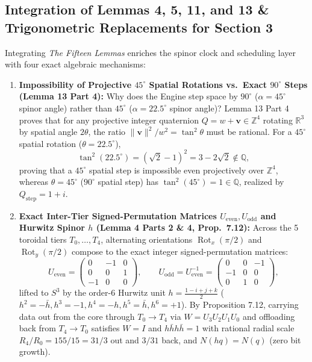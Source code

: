 \documentclass[11pt, a4paper]{article}
\begin{document}
\subsection{Integration of Lemmas 4, 5, 11, and 13 \& Trigonometric Replacements for Section 3}
Integrating \textit{The Fifteen Lemmas} enriches the spinor clock and scheduling layer with four exact algebraic mechanisms:
\begin{enumerate}
    \item \textbf{Impossibility of Projective $45^\circ$ Spatial Rotations vs.\ Exact $90^\circ$ Steps (Lemma 13 Part 4):}
    Why does the Engine step space by $90^\circ$ ($\alpha = 45^\circ$ spinor angle) rather than $45^\circ$ ($\alpha = 22.5^\circ$ spinor angle)? Lemma 13 Part 4 proves that for any projective integer quaternion $Q = w + \mathbf{v} \in \mathbb{Z}^4$ rotating $\mathbb{R}^3$ by spatial angle $2\theta$, the ratio $\|\mathbf{v}\|^2 / w^2 = \tan^2\theta$ must be rational. For a $45^\circ$ spatial rotation ($\theta = 22.5^\circ$),
    \begin{equation}
    \tan^2(22.5^\circ) = (\sqrt{2}-1)^2 = 3 - 2\sqrt{2} \notin \mathbb{Q},
    \end{equation}
    proving that a $45^\circ$ spatial step is impossible even projectively over $\mathbb{Z}^4$, whereas $\theta = 45^\circ$ ($90^\circ$ spatial step) has $\tan^2(45^\circ) = 1 \in \mathbb{Q}$, realized by $Q_{\text{step}} = 1+i$.
    \item \textbf{Exact Inter-Tier Signed-Permutation Matrices $U_{\text{even}}, U_{\text{odd}}$ and Hurwitz Spinor $h$ (Lemma 4 Parts 2 \& 4, Prop.~7.12):}
    Across the 5 toroidal tiers $T_0, \dots, T_4$, alternating orientations $\operatorname{Rot}_x(\pi/2)$ and $\operatorname{Rot}_y(\pi/2)$ compose to the exact integer signed-permutation matrices:
    \begin{equation}
    U_{\text{even}} = \begin{pmatrix} 0 & -1 & 0 \\ 0 & 0 & 1 \\ -1 & 0 & 0 \end{pmatrix}, \qquad U_{\text{odd}} = U_{\text{even}}^{-1} = \begin{pmatrix} 0 & 0 & -1 \\ -1 & 0 & 0 \\ 0 & 1 & 0 \end{pmatrix},
    \end{equation}
    lifted to $S^3$ by the order-6 Hurwitz unit $h = \frac{1 - i + j + k}{2}$ ($h^2 = -\bar{h}, h^3 = -1, h^4 = -h, h^5 = \bar{h}, h^6 = +1$). By Proposition 7.12, carrying data out from the core through $T_0 \to T_4$ via $W = U_3 U_2 U_1 U_0$ and offloading back from $T_4 \to T_0$ satisfies $W = I$ and $h\bar{h}h\bar{h} = 1$ with rational radial scale $R_4/R_0 = 155/15 = 31/3$ out and $3/31$ back, and $N(hq) = N(q)$ (zero bit growth).

\end{enumerate}
\end{document}
